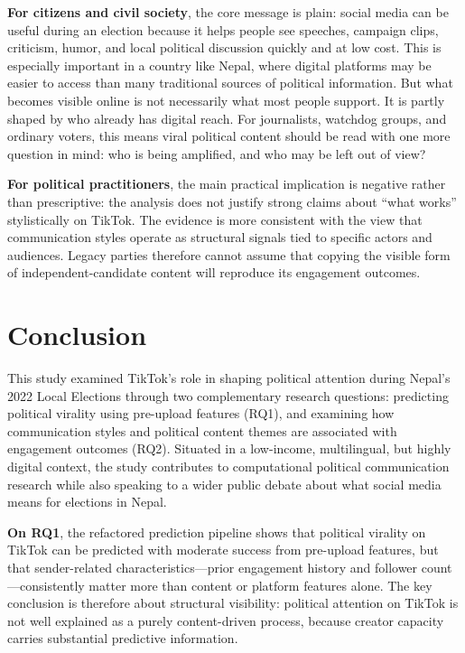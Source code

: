 \documentclass[12pt,a4paper]{report}
\begin{document}
\textbf{For citizens and civil society}, the core message is plain: social media can be useful during an election because it helps people see speeches, campaign clips, criticism, humor, and local political discussion quickly and at low cost. This is especially important in a country like Nepal, where digital platforms may be easier to access than many traditional sources of political information. But what becomes visible online is not necessarily what most people support. It is partly shaped by who already has digital reach. For journalists, watchdog groups, and ordinary voters, this means viral political content should be read with one more question in mind: who is being amplified, and who may be left out of view?

\textbf{For political practitioners}, the main practical implication is negative rather than prescriptive: the analysis does not justify strong claims about ``what works'' stylistically on TikTok. The evidence is more consistent with the view that communication styles operate as structural signals tied to specific actors and audiences. Legacy parties therefore cannot assume that copying the visible form of independent-candidate content will reproduce its engagement outcomes.


\chapter{Conclusion}

This study examined TikTok's role in shaping political attention during Nepal's 2022 Local Elections through two complementary research questions: predicting political virality using pre-upload features (RQ1), and examining how communication styles and political content themes are associated with engagement outcomes (RQ2). Situated in a low-income, multilingual, but highly digital context, the study contributes to computational political communication research while also speaking to a wider public debate about what social media means for elections in Nepal.

\textbf{On RQ1}, the refactored prediction pipeline shows that political virality on TikTok can be predicted with moderate success from pre-upload features, but that sender-related characteristics---prior engagement history and follower count---consistently matter more than content or platform features alone. The key conclusion is therefore about structural visibility: political attention on TikTok is not well explained as a purely content-driven process, because creator capacity carries substantial predictive information.
\end{document}
